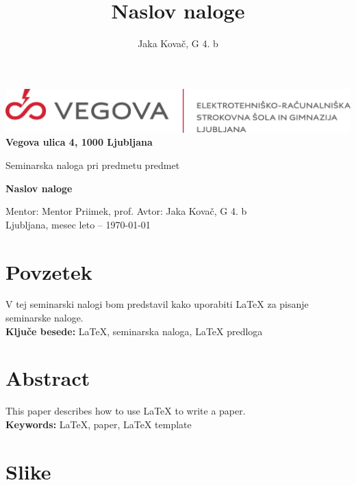 \documentclass[12pt]{article}
\title{Naslov naloge}
\author{Jaka Kovač, G 4. b}
\begin{document}

\begin{center}
    \thispagestyle{empty}
    \includegraphics[scale=1]{slike/logotip_vegova_leze_brezokvirja.png}
    \\
    \textbf{Vegova ulica 4, 1000 Ljubljana}

    \vspace{\fill} 
    Seminarska naloga pri predmetu predmet

    \Huge{\textbf{Naslov naloge}}

    \normalsize
    \vspace{\fill}

    Mentor: Mentor Priimek, prof. \hfill Avtor: Jaka Kovač, G 4. b\\
    \null
    Ljubljana, mesec leto – \MMYYYYdate\today %
\end{center}
\newpage
\thispagestyle{empty}
\null
\newpage

\section*{Povzetek}
V tej seminarski nalogi bom predstavil kako uporabiti \LaTeX{} za pisanje seminarske naloge.
\\ %
\textbf{Ključe besede:} \LaTeX{}, seminarska naloga, \LaTeX{} predloga

\vfill
\section*{Abstract}
\foreignlanguage{english}{This paper describes how to use \LaTeX{} to write a paper.
\\ %
\textbf{Keywords:} \LaTeX{}, paper, \LaTeX{} template}
\vfill

\newpage
\thispagestyle{empty} %
\tableofcontents %

\begingroup     %
\makeatletter
\section*{Slike}
\let\clearpage\relax
\makeatother
\endgroup
\end{document}
